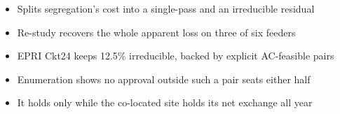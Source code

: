 
\begin{itemize}
\item Splits segregation's cost into a single-pass and an irreducible residual
\item Re-study recovers the whole apparent loss on three of six feeders
\item EPRI Ckt24 keeps 12.5\% irreducible, backed by explicit AC-feasible pairs
\item Enumeration shows no approval outside such a pair seats either half
\item It holds only while the co-located site holds its net exchange all year
\end{itemize}
